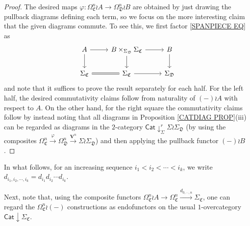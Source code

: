 \documentclass[a4paper,10pt
]{article}%
\numberwithin{equation}{section}
\numberwithin{figure}{section}
\theoremstyle{definition} %
\newcommand{\1}{\ensuremath{\mathbbm 1}}%
\begin{document}
\begin{proof}
	The desired maps 
	$\varphi \colon
	\Omega_{\mathfrak{C}}^n \wr A \to 
	\Omega_{\mathfrak{D}}^n \wr B $
	are obtained by just drawing the pullback diagrams defining each term,
	so we focus on the more interesting claim that the given diagrams commute.
	To see this, we first factor \eqref{SPANPIECE EQ} as
	\[
	\begin{tikzcd}
	A \ar{d} \ar{r} & B \times_{\Sigma_{\mathfrak{D}}} \Sigma_{\mathfrak{C}} \ar{r} \ar{d} &  \ar{d} B
	\\
	\Sigma_{\mathfrak{C}} \ar[equal]{r} & \Sigma_{\mathfrak{C}} \ar{r} & \Sigma_{\mathfrak{D}}
	\end{tikzcd}
	\]
	and note that it suffices to prove the result separately for each half.
	For the left half, the desired commutativity claims 
	follow from naturality of $(-) \wr A$ with respect to $A$.
%
	On the other hand, for the right square the commutativity claims follow by instead noting that all diagrams in 
	Proposition \ref{CATDIAG PROP}(iii)
	can be regarded as diagrams in the $2$-category
	$\mathsf{Cat} \downarrow^r_{\Sigma} \Sigma \wr \Sigma_{\mathfrak{D}}$
	(by using the composites 
	$\Omega_{\mathfrak{C}}^n \xrightarrow{\varphi} \Omega_{\mathfrak{D}}^n \xrightarrow{\boldsymbol{V}^n} \Sigma \wr \Sigma_{\mathfrak{D}}$) 
	and then applying the pullback functor $(-) \wr B$. 
\end{proof}



In what follows, 
for an increasing sequence $i_1<i_2<\cdots<i_k$,
we write
$d_{i_1,i_2,\cdots,i_k}=d_{i_1} d_{i_2} \cdots d_{i_k}$.


Next, note that, using the composite functors 
$\Omega^n_{\mathfrak{C}} \wr A \to \Omega^n_{\mathfrak{C}} 
\xrightarrow{d_{0,\cdots,n}} \Sigma_{\mathfrak{C}}$,
one can regard the $\Omega_{\mathfrak{C}}^n \wr (-)$ constructions
as endofunctors on the usual $1$-overcategory
$\mathsf{Cat} \downarrow \Sigma_{\mathfrak{C}}$.
\end{document}
